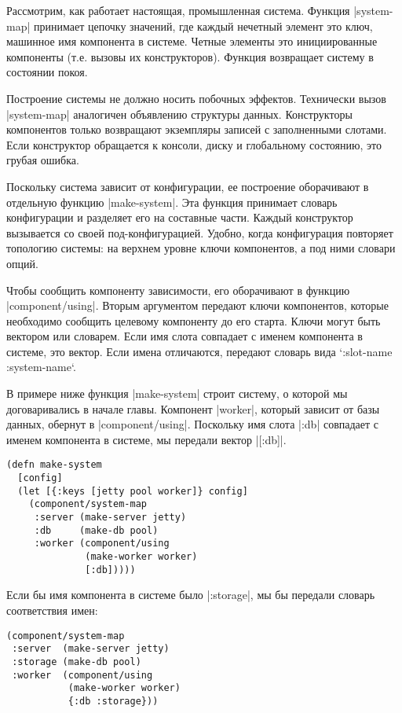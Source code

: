 Рассмотрим, как работает настоящая, промышленная система. Функция \spverb|system-map|
принимает цепочку значений, где каждый нечетный элемент это ключ, машинное имя
компонента в системе. Четные элементы это инициированные компоненты (т.е. вызовы
их конструкторов). Функция возвращает систему в состоянии покоя.

Построение системы не должно носить побочных эффектов. Технически вызов
\spverb|system-map| аналогичен объявлению структуры данных. Конструкторы компонентов
только возвращают экземпляры записей с заполненными слотами. Если конструктор
обращается к консоли, диску и глобальному состоянию, это грубая ошибка.

Поскольку система зависит от конфигурации, ее построение оборачивают в отдельную
функцию \spverb|make-system|. Эта функция принимает словарь конфигурации и разделяет
его на составные части. Каждый конструктор вызывается со своей
под-конфигурацией. Удобно, когда конфигурация повторяет топологию системы: на
верхнем уровне ключи компонентов, а под ними словари опций.

Чтобы сообщить компоненту зависимости, его оборачивают в функцию
\spverb|component/using|. Вторым аргументом передают ключи компонентов, которые
необходимо сообщить целевому компоненту до его старта. Ключи могут быть вектором
или словарем. Если имя слота совпадает с именем компонента в системе, это
вектор. Если имена отличаются, передают словарь вида `{:slot-name
:system-name}`.

В примере ниже функция \spverb|make-system| строит систему, о которой мы договаривались
в начале главы. Компонент \spverb|worker|, который зависит от базы данных, обернут в
\spverb|component/using|. Поскольку имя слота \spverb|:db| совпадает с именем компонента в
системе, мы передали вектор \spverb|[:db]|.

\begin{verbatim}
(defn make-system
  [config]
  (let [{:keys [jetty pool worker]} config]
    (component/system-map
     :server (make-server jetty)
     :db     (make-db pool)
     :worker (component/using
              (make-worker worker)
              [:db]))))
\end{verbatim}

Если бы имя компонента в системе было \spverb|:storage|, мы бы передали словарь
соответствия имен:

\begin{verbatim}
(component/system-map
 :server  (make-server jetty)
 :storage (make-db pool)
 :worker  (component/using
           (make-worker worker)
           {:db :storage}))
\end{verbatim}

